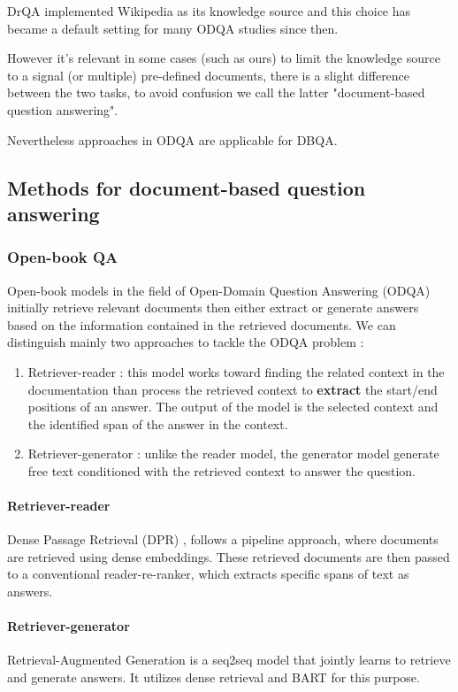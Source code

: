 \documentclass[a4paper,12pt]{article}
\begin{document}
DrQA \cite{drqa} implemented Wikipedia as its knowledge source and this choice has became a default setting for many ODQA studies since then.

However it's relevant in some cases (such as ours) to limit the knowledge source to a signal (or multiple) pre-defined documents, there is a slight difference between the two tasks, to avoid confusion we call the latter "document-based question answering". 

Nevertheless approaches in ODQA are applicable for DBQA.

\subsection{Methods for document-based question answering}
\subsubsection{Open-book QA}
Open-book models in the field of Open-Domain Question Answering (ODQA) initially retrieve relevant documents then either extract or generate answers based on the information contained in the retrieved documents. We can distinguish mainly two approaches to tackle the ODQA problem :

\begin{enumerate}
    \item Retriever-reader : this model works toward finding the related context in the documentation than process the retrieved context to \textbf{extract} the start/end positions of an answer. The output of the model is the selected context and the identified span of the answer in the context. 
    \item Retriever-generator : unlike the reader model, the generator model generate free text conditioned with the retrieved context to answer the question.
\end{enumerate}

\paragraph{Retriever-reader}
Dense Passage Retrieval (DPR) \cite{dpr}, follows a pipeline approach, where documents are retrieved using dense embeddings. These retrieved documents are then passed to a conventional reader-re-ranker, which extracts specific spans of text as answers.

\paragraph{Retriever-generator}
Retrieval-Augmented Generation \cite{rag} is a seq2seq model that jointly learns to retrieve and generate answers. It utilizes dense retrieval and BART \cite{bart} for this purpose.
\end{document}
